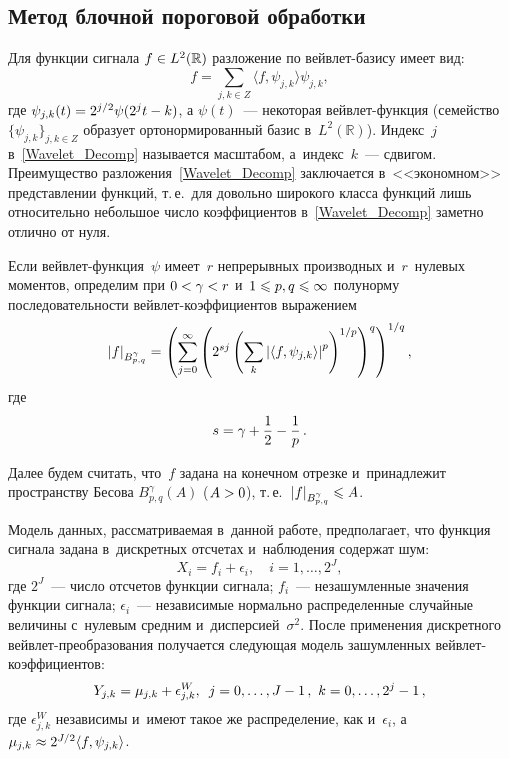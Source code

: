 \begin{multicols}{2}
\section{Метод блочной пороговой обработки}

Для функции сигнала $f\hm\in L^2(\mathbb{R})$ разложение по вейв\-лет-ба\-зи\-су имеет вид:
\begin{equation}
f=\sum\limits_{j,k\in Z}\langle f,\psi_{j,k}\rangle\psi_{j,k},
\label{Wavelet_Decomp}
\end{equation}
где $\psi_{j,k}(t)\hm=2^{j/2}\psi(2^jt-k)$, а $\psi(t)$~--- 
некоторая вейв\-лет-функ\-ция (семейство $\{\psi_{j,k}\}_{j,k\in Z}$ образует 
ортонормированный базис в~$L^2(\mathbb{R})$). Индекс~$j$ в~\eqref{Wavelet_Decomp} 
называется масштабом, а~индекс~$k$~--- сдвигом. Преимущество разложения~\eqref{Wavelet_Decomp} 
заключается в~<<экономном>> представлении функций, т.\,е.\ 
для довольно широкого класса функций лишь относительно небольшое число коэффициентов 
в~\eqref{Wavelet_Decomp} заметно отлично от нуля.

Если вейвлет-функ\-ция~$\psi$ имеет~$r$ непрерывных производных и~$r$~нулевых моментов, 
определим при $0\hm<\gamma\hm<r$ и~$1\hm\leqslant p,q\hm\leqslant\infty$ 
полунорму последовательности вейв\-лет-ко\-эф\-фи\-ци\-ен\-тов выражением
$$
\left\vert f\right\vert_{B^{\gamma}_{p,q}}=\left(\sum\limits_{j=0}^{\infty}\left(2^{sj}\left(
\sum\limits_{k}\left\vert\langle f,\psi_{j,k}\rangle\right\vert^p\right)^{1/p}\right)^q\right)^{1/q},
$$
где 
$$
s=\gamma+\displaystyle\frac{\displaystyle 1\mathstrut}{\displaystyle 2\mathstrut}-\displaystyle\frac{\displaystyle 1\mathstrut}{\displaystyle p\mathstrut}\,.
$$

 Далее будем считать, что~$f$ задана на конечном отрезке и~принадлежит
 пространству Бесова $B^{\gamma}_{p,q}(A)$ ($A\hm>0$), т.\,е.\ $\abs{f}_{{B}^{\gamma}_{p,q}}\hm\leqslant A$.

Модель данных, рассматриваемая в~данной работе, предполагает, что функция сигнала задана в~дискретных 
отсчетах и~наблюдения содержат шум:
\begin{equation*}
X_i = f_i + \epsilon_i, \quad i = 1, \dots, 2^J,
\end{equation*}
где $2^J$~--- число отсчетов функции сигнала; $f_i$~--- 
незашумленные значения функции сигнала; $\epsilon_i$~--- 
независимые нормально распределенные случайные величины с~нулевым средним и~дисперсией~$\sigma^2$.
После применения дискретного вейв\-лет-пре\-обра\-зо\-ва\-ния получается следующая модель зашумленных 
вейв\-лет-ко\-эф\-фи\-ци\-ен\-тов:
\begin{equation*}
Y_{j,k}=\mu_{j,k}+\epsilon^W_{j,k},\enskip j=0,\ldots,J-1\,,\ k=0,\ldots,2^{j}-1\,,
\end{equation*}
где $\epsilon^W_{j,k}$ независимы и~имеют такое же распределение, как и~$\epsilon_i$, 
а~$\mu_{j,k}\hm\approx 2^{J/2}\langle f,\psi_{j,k}\rangle$.


\end{multicols}
